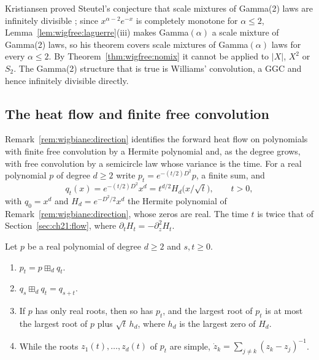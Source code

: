Kristiansen proved Steutel's conjecture that scale mixtures of Gamma(2) laws are infinitely divisible \cite{Kristiansen94}; since $x^{\alpha-2}e^{-x}$ is completely monotone for $\alpha\le2$, Lemma~\ref{lem:wigfree:laguerre}(iii) makes Gamma$(\alpha)$ a scale mixture of Gamma(2) laws, so his theorem covers scale mixtures of Gamma$(\alpha)$ laws for every $\alpha\le2$. By Theorem~\ref{thm:wigfree:nomix} it cannot be applied to $|X|$, $X^2$ or $S_2$. The Gamma(2) structure that is true is Williams' convolution, a GGC and hence infinitely divisible directly.

\subsection{The heat flow and finite free convolution}\label{sec:wigfree:heat}

Remark~\ref{rem:wigbiane:direction} identifies the forward heat flow on polynomials with finite free convolution by a Hermite polynomial and, as the degree grows, with free convolution by a semicircle law whose variance is the time. For a real polynomial $p$ of degree $d\ge2$ write $p_t=e^{-(t/2)D^2}p$, a finite sum, and
\[
q_t(x)=e^{-(t/2)D^2}x^d=t^{d/2}H_d\big(x/\sqrt t\big),\qquad t>0,
\]
with $q_0=x^d$ and $H_d=e^{-D^2/2}x^d$ the Hermite polynomial of Remark~\ref{rem:wigbiane:direction}, whose zeros are real. The time $t$ is twice that of Section~\ref{sec:ch21:flow}, where $\partial_tH_t=-\partial_z^2H_t$.

\begin{proposition}\label{prop:wigfree:heat}
Let $p$ be a real polynomial of degree $d\ge2$ and $s,t\ge0$.
\begin{enumerate}
\item[(i)] $p_t=p\boxplus_dq_t$.
\item[(ii)] $q_s\boxplus_dq_t=q_{s+t}$.
\item[(iii)] If $p$ has only real roots, then so has $p_t$, and the largest root of $p_t$ is at most the largest root of $p$ plus $\sqrt t\,h_d$, where $h_d$ is the largest zero of $H_d$.
\item[(iv)] While the roots $z_1(t),\dots,z_d(t)$ of $p_t$ are simple, $\dot z_k=\sum_{j\ne k}(z_k-z_j)^{-1}$.
\end{enumerate}
\end{proposition}

